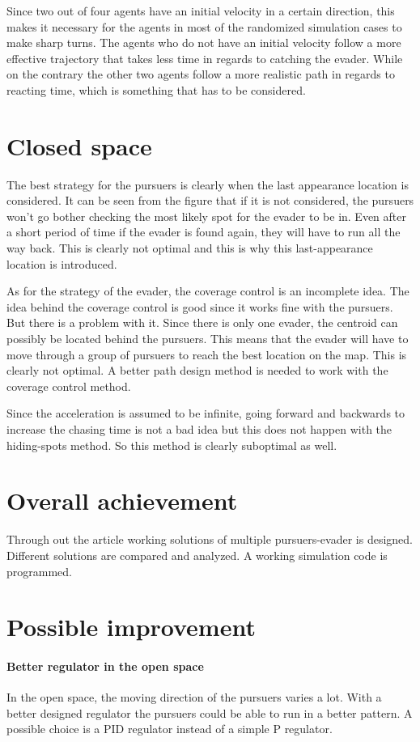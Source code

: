 \documentclass[ebook,11pt] {kth-mag}
\begin{document}
Since two out of four agents have an initial velocity in a certain direction, this makes it necessary for the agents in most of the randomized simulation cases to make sharp turns. The agents who do not have an initial velocity follow a more effective trajectory that takes less time in regards to catching the evader. While on the contrary the other two agents follow a more realistic path in regards to reacting time, which is something that has to be considered. 

\section{Closed space}
The best strategy for the pursuers is clearly when the last appearance location is considered. It can be seen from the figure that if it is not considered, the pursuers won't go bother checking the most likely spot for the evader to be in. Even after a short period of time if the evader is found again, they will have to run all the way back. This is clearly not optimal and this is why this last-appearance location is introduced. 

As for the strategy of the evader, the coverage control is an incomplete idea. The idea behind the coverage control is good since it works fine with the pursuers. But there is a problem with it. Since there is only one evader, the centroid can possibly be located behind the pursuers. This means that the evader will have to move through a group of pursuers to reach the best location on the map. This is clearly not optimal. A better path design method is needed to work with the coverage control method. 

Since the acceleration is assumed to be infinite, going forward and backwards to increase the chasing time is not a bad idea but this does not happen with the hiding-spots method. So this method is clearly suboptimal as well. 


\section{Overall achievement}
Through out the article working solutions of multiple pursuers-evader is designed. Different solutions are compared and analyzed. A working simulation code is programmed. 

\section{Possible improvement}
\paragraph{Better regulator in the open space}
In the open space, the moving direction of the pursuers varies a lot. With a better designed regulator the pursuers could be able to run in a better pattern. A possible choice is a PID regulator instead of a simple P regulator. 
\end{document}
